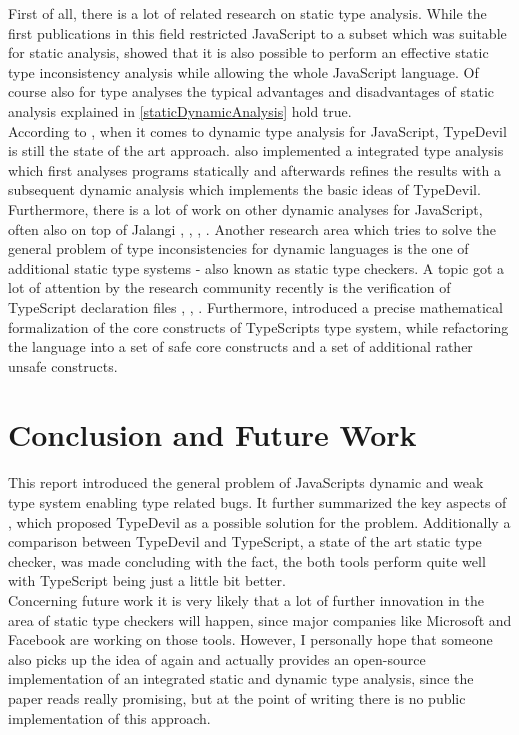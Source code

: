 \documentclass[runningheads,a4paper]{llncs}
\begin{document}
First of all, there is a lot of related research on static type analysis.
While the first publications in this field restricted JavaScript to a subset which was suitable for static analysis, \cite{DBLP:conf/sas/JensenMT09} showed that it is also possible to perform an effective static type inconsistency analysis while allowing the whole JavaScript language.
Of course also for type analyses the typical advantages and disadvantages of static analysis explained in \ref{staticDynamicAnalysis} hold true.\\
According to \cite{DBLP:conf/icse/TanXCLYS17}, when it comes to dynamic type analysis for JavaScript, TypeDevil is still the state of the art approach. 
\cite{DBLP:conf/icse/TanXCLYS17} also implemented a integrated type analysis which first analyses programs statically and afterwards refines the results with a subsequent dynamic analysis which implements the basic ideas of TypeDevil.
Furthermore, there is a lot of work on other dynamic analyses for JavaScript, often also on top of Jalangi \cite{DBLP:phd/basesearch/Austin13}, \cite{DBLP:conf/issta/GongPSS15}, \cite{DBLP:conf/sigsoft/GongPS15}, \cite{DBLP:conf/sigsoft/JensenSSC15}.
Another research area which tries to solve the general problem of type inconsistencies for dynamic languages is the one of additional static type systems - also known as static type checkers.
A topic got a lot of attention by the research community recently is the verification of TypeScript declaration files \cite{DBLP:conf/fase/KristensenM17}, \cite{DBLP:conf/ecoop/WilliamsMWZ17}, \cite{DBLP:journals/pacmpl/KristensenM17}.
Furthermore, \cite{DBLP:conf/ecoop/BiermanAT14} introduced a precise mathematical formalization of the core constructs of TypeScripts type system, while refactoring the language into a set of safe core constructs and a set of additional rather unsafe constructs.


\section{Conclusion and Future Work}
This report introduced the general problem of JavaScripts dynamic and weak type system enabling type related bugs.
It further summarized the key aspects of \cite{DBLP:conf/icse/PradelSS15}, which proposed TypeDevil as a possible solution for the problem.
Additionally a comparison between TypeDevil and TypeScript, a state of the art static type checker, was made concluding with the fact, the both tools perform quite well with TypeScript being just a little bit better.\\
Concerning future work it is very likely that a lot of further innovation in the area of static type checkers will happen, since major companies like Microsoft and Facebook are working on those tools.
However, I personally hope that someone also picks up the idea of \cite{DBLP:conf/icse/TanXCLYS17} again and actually provides an open-source implementation of an integrated static and dynamic type analysis, since the paper reads really promising, but at the point of writing there is no public implementation of this approach.  
\end{document}
